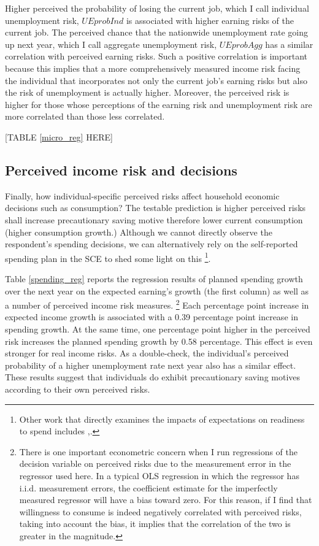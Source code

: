 \documentclass[12pt,notitlepage,onecolumn,aps,pra]{article}
\begin{document}
Higher perceived the probability of losing the current job, which I call
individual unemployment risk, \(\textit{UEprobInd}\) is associated with
higher earning risks of the current job. The perceived chance that the
nationwide unemployment rate going up next year, which I call aggregate
unemployment risk, \(\textit{UEprobAgg}\) has a similar correlation with
perceived earning risks. Such a positive correlation is important
because this implies that a more comprehensively measured income risk
facing the individual that incorporates not only the current job's
earning risks but also the risk of unemployment is actually higher.
Moreover, the perceived risk is higher for those whose perceptions of
the earning risk and unemployment risk are more correlated than those
less correlated.

{[}TABLE \ref{micro_reg} HERE{]}



    \hypertarget{perceived-income-risk-and-decisions}{%
\subsection{Perceived income risk and
decisions}\label{perceived-income-risk-and-decisions}}

Finally, how individual-specific perceived risks affect household
economic decisions such as consumption? The testable prediction is
higher perceived risks shall increase precautionary saving motive
therefore lower current consumption (higher consumption growth.)
Although we cannot directly observe the respondent's spending decisions,
we can alternatively rely on the self-reported spending plan in the SCE
to shed some light on this
\footnote{Other work that directly examines the impacts of expectations on readiness to spend includes \cite{bachmann2015inflation},\cite{coibion2020forward}.}.

Table \ref{spending_reg} reports the regression results of planned
spending growth over the next year on the expected earning's growth (the
first column) as well as a number of perceived income risk measures.
\footnote{There is one important econometric concern when I run regressions of the decision variable on perceived risks due to the measurement error in the regressor used here. In a typical OLS regression in which the regressor has i.i.d. measurement errors, the coefficient estimate for the imperfectly measured regressor will have a bias toward zero. For this reason, if I find that willingness to consume is indeed negatively correlated with perceived risks, taking into account the bias, it implies that the correlation of the two is greater in the magnitude.}
Each percentage point increase in expected income growth is associated
with a 0.39 percentage point increase in spending growth. At the same
time, one percentage point higher in the perceived risk increases the
planned spending growth by 0.58 percentage. This effect is even stronger
for real income risks. As a double-check, the individual's perceived
probability of a higher unemployment rate next year also has a similar
effect. These results suggest that individuals do exhibit precautionary
saving motives according to their own perceived risks.
\end{document}
